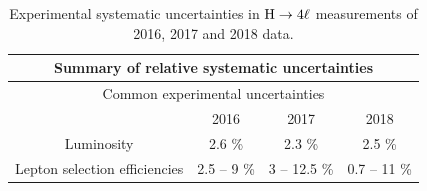 \begin{table}[!htb]
        \begin{center}
                \small
                \caption{
                        Experimental systematic uncertainties in $\mathrm{H}\rightarrow4\ell$ measurements of 2016, 2017 and 2018 data. %
                        \label{tab:SystOverviewABC}
                }
                \begin{tabular}{|c|c|c|c|} 
                        \hline %
                        \hline %
                        \multicolumn{4}{|c|}{\textbf{Summary of relative systematic uncertainties}} \\
                        \hline %
                        \hline %
                        \multicolumn{4}{|c|}{Common experimental uncertainties} \\
                        \hline %
                          & 2016 & 2017 & 2018 \\
      \hline %
                        Luminosity & 2.6 \% & 2.3 \% & 2.5 \% \\  
                        Lepton selection efficiencies & 2.5 -- 9 \% & 3 -- 12.5 \% & 0.7 -- 11 \% \\  

\end{tabular}
\end{center}
\end{table}
